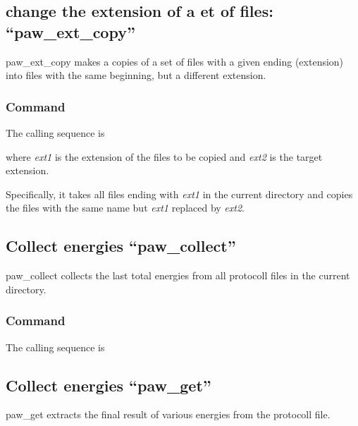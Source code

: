 \documentclass[final,12pt]{article}
\begin{document}
{{{{{{%
\subsection{change the extension  of a et of files: ``paw\_ext\_copy''}
paw\_ext\_copy makes a copies of a set of files with a given ending (extension) into files with the same beginning, but a different extension.


\subsubsection{Command}
The calling sequence is

\bigskip{}\bigskip

\noindent where {\it ext1} is the extension of the files to be
copied and \textit{ext2} is the target extension.

Specifically, it takes all files ending with \textit{ext1} in the
current directory and copies the files with the same name but
\textit{ext1} replaced by \textit{ext2}.

\subsection{Collect energies ``paw\_collect''}
paw\_collect collects the last total energies from all protocoll files
in the current directory.

\subsubsection{Command}
The calling sequence is

\bigskip{}

\subsection{Collect energies ``paw\_get''}
paw\_get extracts the final result of various energies from the
protocoll file.

}}}}}}
\end{document}
